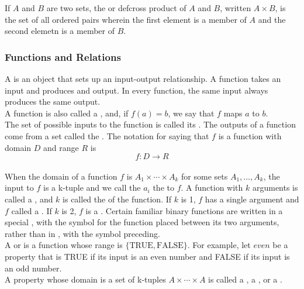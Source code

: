 \documentclass{article}
\begin{document}
If $A$ and $B$ are two sets, the  or def{cross product} of $A$ and $B$, written $A \times B$, is the set of all ordered pairs wherein the first element is a member of $A$ and the second elemetn is a member of $B$. 

\subsubsection{Functions and Relations} 

A  is an object that sets up an input-output relationship. A function takes an input and produces and output. In every function, the same input always produces the same output. \\ 

A function is also called a , and, if $f(a) = b$, we say that $f$ maps $a$ to $b$. \\ 

The set of possible inputs to the function is called its . The outputs of a function come from a set called the . The notation for saying that $f$ is a function with domain $D$ and range $R$ is $$f: D \rightarrow R$$ \\ 

When the domain of a function $f$ is $A_{1} \times \cdots \times A_{k}$ for some sets $A_{1}, \dots, A_{k}$, the input to $f$ is a k-tuple and we call the $a_i$ the  to $f$. A function with $k$ arguments is called a , and $k$ is called the  of the function. If $k$ is 1, $f$ has a single argument and $f$ called a . If $k$ is 2, $f$ is a . Certain familiar binary functions are written in a special , with the symbol for the function placed between its two arguments, rather than in , with the symbol preceding. \\ 

A  or  is a function whose range is $\{\textrm{TRUE}, \textrm{FALSE}\}$. For example, let $even$ be a property that is TRUE if its input is an even number and FALSE if its input is an odd number. \\ 

A property whose domain is a set of k-tuples $A \times \cdots \times A$ is called a , a , or a . \\
\end{document}
